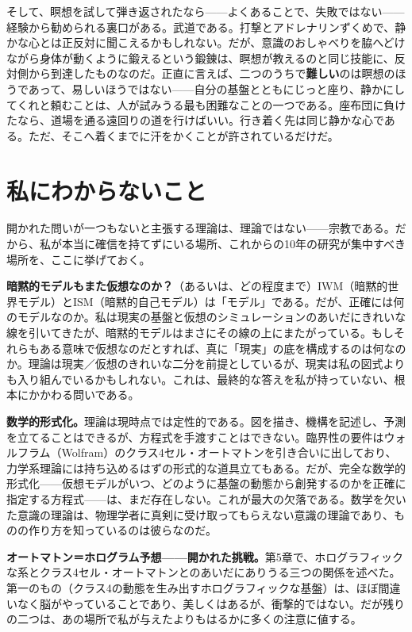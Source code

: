 \documentclass[11pt, twoside, openright]{book}
\begin{document}
そして、瞑想を試して弾き返されたなら------よくあることで、失敗ではない------経験から勧められる裏口がある。武道である。打撃とアドレナリンずくめで、静かな心とは正反対に聞こえるかもしれない。だが、意識のおしゃべりを脇へどけながら身体が動くように鍛えるという鍛錬は、瞑想が教えるのと同じ技能に、反対側から到達したものなのだ。正直に言えば、二つのうちで\textbf{難しい}のは瞑想のほうであって、易しいほうではない------自分の基盤とともにじっと座り、静かにしてくれと頼むことは、人が試みうる最も困難なことの一つである。座布団に負けたなら、道場を通る遠回りの道を行けばいい。行き着く先は同じ静かな心である。ただ、そこへ着くまでに汗をかくことが許されているだけだ。

\section*{私にわからないこと}

開かれた問いが一つもないと主張する理論は、理論ではない------宗教である。だから、私が本当に確信を持てずにいる場所、これからの10年の研究が集中すべき場所を、ここに挙げておく。

\textbf{暗黙的モデルもまた仮想なのか？}（あるいは、どの程度まで）IWM（暗黙的世界モデル）とISM（暗黙的自己モデル）は「モデル」である。だが、正確には何のモデルなのか。私は現実の基盤と仮想のシミュレーションのあいだにきれいな線を引いてきたが、暗黙的モデルはまさにその線の上にまたがっている。もしそれらもある意味で仮想なのだとすれば、真に「現実」の底を構成するのは何なのか。理論は現実／仮想のきれいな二分を前提としているが、現実は私の図式よりも入り組んでいるかもしれない。これは、最終的な答えを私が持っていない、根本にかかわる問いである。

\textbf{数学的形式化。}理論は現時点では定性的である。図を描き、機構を記述し、予測を立てることはできるが、方程式を手渡すことはできない。臨界性の要件はウォルフラム（Wolfram）のクラス4セル・オートマトンを引き合いに出しており、力学系理論には持ち込めるはずの形式的な道具立てもある。だが、完全な数学的形式化------仮想モデルがいつ、どのように基盤の動態から創発するのかを正確に指定する方程式------は、まだ存在しない。これが最大の欠落である。数学を欠いた意識の理論は、物理学者に真剣に受け取ってもらえない意識の理論であり、ものの作り方を知っているのは彼らなのだ。

\textbf{オートマトン＝ホログラム予想------開かれた挑戦。}第5章で、ホログラフィックな系とクラス4セル・オートマトンとのあいだにありうる三つの関係を述べた。第一のもの（クラス4の動態を生み出すホログラフィックな基盤）は、ほぼ間違いなく脳がやっていることであり、美しくはあるが、衝撃的ではない。だが残りの二つは、あの場所で私が与えたよりもはるかに多くの注意に値する。
\end{document}

